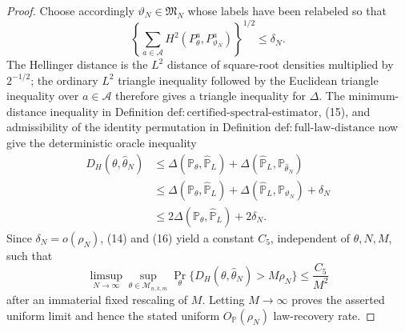 \documentclass{article}
\begin{document}
\begin{proof}
Choose accordingly \(\vartheta_N\in\mathfrak M_N\) whose labels have been relabeled so that
\[
 \left\{\sum_{a\in\mathcal A}H^2(P_\theta^a,P_{\vartheta_N}^a)\right\}^{1/2}
 \leq\delta_N.
\tag{15}
\]
The Hellinger distance is the \(L^2\) distance of square-root densities multiplied by \(2^{-1/2}\); the ordinary \(L^2\) triangle inequality followed by the Euclidean triangle inequality over \(a\in\mathcal A\) therefore gives a triangle inequality for \(\Delta\).  The minimum-distance inequality in Definition \(\mathrm{def:certified\text{-}spectral\text{-}estimator}\), (15), and admissibility of the identity permutation in Definition \(\mathrm{def:full\text{-}law\text{-}distance}\) now give the deterministic oracle inequality
\[
\begin{aligned}
 D_H(\theta,\widehat\theta_N)
 &\leq\Delta(\mathbb P_\theta,\widehat{\mathbb P}_L)
      +\Delta(\widehat{\mathbb P}_L,\mathbb P_{\widehat\theta_N})\\
 &\leq\Delta(\mathbb P_\theta,\widehat{\mathbb P}_L)
      +\Delta(\widehat{\mathbb P}_L,\mathbb P_{\vartheta_N})+\delta_N\\
 &\leq2\Delta(\mathbb P_\theta,\widehat{\mathbb P}_L)+2\delta_N.
\end{aligned}
\tag{16}
\]
Since \(\delta_N=o(\rho_N)\), (14) and (16) yield a constant \(C_5\), independent of \(\theta,N,M\), such that
\[
 \limsup_{N\to\infty}\sup_{\theta\in\mathcal M_{n,k,m}}
 \Pr_\theta\{D_H(\theta,\widehat\theta_N)>M\rho_N\}
 \leq \frac{C_5}{M^2}
\]
after an immaterial fixed rescaling of \(M\).  Letting \(M\to\infty\) proves the asserted uniform limit and hence the stated uniform \(O_{\mathbb P}(\rho_N)\) law-recovery rate.
\end{proof}
\end{document}
